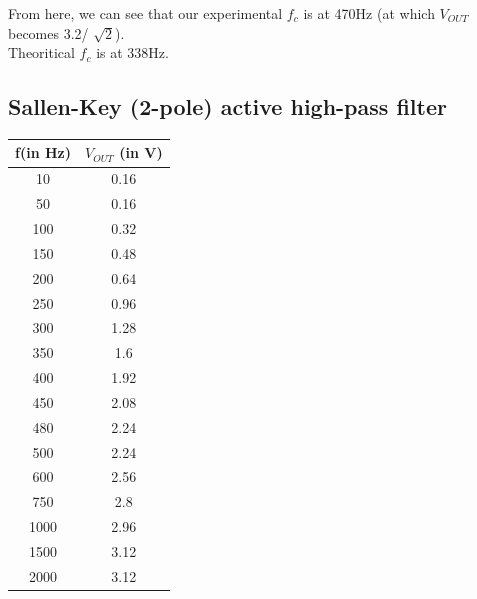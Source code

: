 \documentclass[12pt]{article}
\begin{document}
From here, we can see that our experimental $f_c$ is at 470Hz (at which $V_{OUT}$ becomes 3.2/ $\sqrt{2} $).\\
Theoritical $f_c$ is at 338Hz.


\subsection{ Sallen-Key (2-pole) active high-pass filter}
\begin{table}[H]
		\begin{center}
		
		\begin{tabular}{|c|c|}
			\hline
			\textbf{f(in Hz)} & \textbf{$V_{OUT}$ (in V)}\\
			\hline
			10 & 0.16\\
			\hline
			50 & 0.16\\
			\hline
                   100 & 0.32\\
			\hline
                   150 & 0.48\\
			\hline
200 & 0.64\\
			\hline
250 & 0.96\\
			\hline
300 & 1.28\\
			\hline
350 & 1.6\\
			\hline
400 & 1.92\\
			\hline
450 & 2.08\\
			\hline
480 & 2.24\\
			\hline
500 & 2.24\\
			\hline
600 & 2.56\\
			\hline
750 & 2.8\\
			\hline
1000 & 2.96\\
			\hline
1500 & 3.12\\
			\hline
2000 & 3.12\\
			\hline

            
		\end{tabular}
		\end{center}
\end{table}
\end{document}
